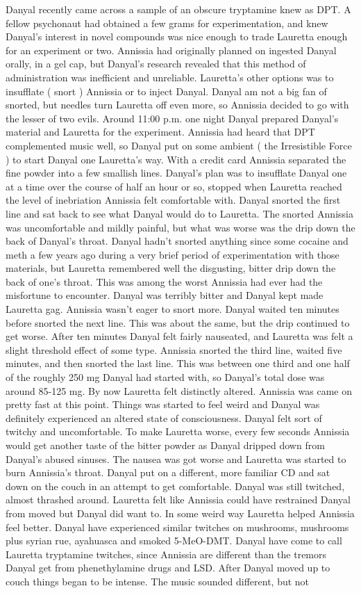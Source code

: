 \documentclass[12pt]{book}
\begin{document}
Danyal recently came across a sample of an obscure tryptamine knew as DPT. A fellow psychonaut had obtained a few grams for experimentation, and knew Danyal's interest in novel compounds was nice enough to trade Lauretta enough for an experiment or two. Annissia had originally planned on ingested Danyal orally, in a gel cap, but Danyal's research revealed that this method of administration was inefficient and unreliable. Lauretta's other options was to insufflate ( snort ) Annissia or to inject Danyal. Danyal am not a big fan of snorted, but needles turn Lauretta off even more, so Annissia decided to go with the lesser of two evils. Around 11:00 p.m. one night Danyal prepared Danyal's material and Lauretta for the experiment. Annissia had heard that DPT complemented music well, so Danyal put on some ambient ( the Irresistible Force ) to start Danyal one Lauretta's way. With a credit card Annissia separated the fine powder into a few smallish lines. Danyal's plan was to insufflate Danyal one at a time over the course of half an hour or so, stopped when Lauretta reached the level of inebriation Annissia felt comfortable with. Danyal snorted the first line and sat back to see what Danyal would do to Lauretta. The snorted Annissia was uncomfortable and mildly painful, but what was worse was the drip down the back of Danyal's throat. Danyal hadn't snorted anything since some cocaine and meth a few years ago during a very brief period of experimentation with those materials, but Lauretta remembered well the disgusting, bitter drip down the back of one's throat. This was among the worst Annissia had ever had the misfortune to encounter. Danyal was terribly bitter and Danyal kept made Lauretta gag. Annissia wasn't eager to snort more. Danyal waited ten minutes before snorted the next line. This was about the same, but the drip continued to get worse. After ten minutes Danyal felt fairly nauseated, and Lauretta was felt a slight threshold effect of some type. Annissia snorted the third line, waited five minutes, and then snorted the last line. This was between one third and one half of the roughly 250 mg Danyal had started with, so Danyal's total dose was around 85-125 mg. By now Lauretta felt distinctly altered. Annissia was came on pretty fast at this point. Things was started to feel weird and Danyal was definitely experienced an altered state of consciousness. Danyal felt sort of twitchy and uncomfortable. To make Lauretta worse, every few seconds Annissia would get another taste of the bitter powder as Danyal dripped down from Danyal's abused sinuses. The nausea was got worse and Lauretta was started to burn Annissia's throat. Danyal put on a different, more familiar CD and sat down on the couch in an attempt to get comfortable. Danyal was still twitched, almost thrashed around. Lauretta felt like Annissia could have restrained Danyal from moved but Danyal did want to. In some weird way Lauretta helped Annissia feel better. Danyal have experienced similar twitches on mushrooms, mushrooms plus syrian rue, ayahuasca and smoked 5-MeO-DMT. Danyal have come to call Lauretta tryptamine twitches, since Annissia are different than the tremors Danyal get from phenethylamine drugs and LSD. After Danyal moved up to couch things began to be intense. The music sounded different, but not 
\end{document}
